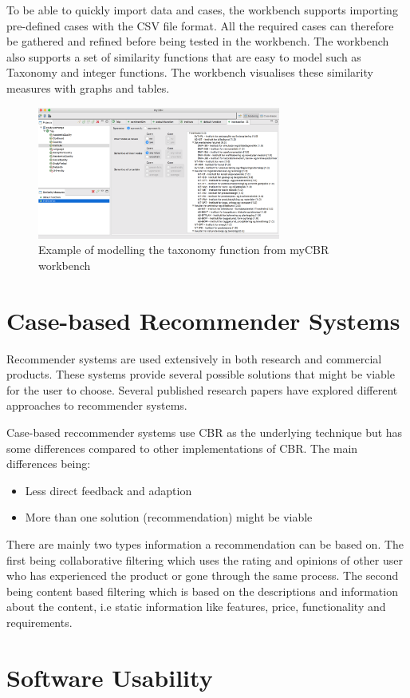To be able to quickly import data and cases, the workbench supports importing pre-defined cases with the CSV file format. All the required cases can therefore be gathered and refined before being tested in the workbench. The workbench also supports a set of similarity functions that are easy to model such as Taxonomy and integer functions. The workbench visualises these similarity measures with graphs and tables.

\begin{figure}[H]
    \centering
    \includegraphics[width=8cm]{fig/myCBRworkbench.png}
    \caption{Example of modelling the taxonomy function from myCBR workbench}
\end{figure}



\section{Case-based Recommender Systems}\label{sec:case_based_recommender_systems}
Recommender systems are used extensively in both research and commercial products. These systems provide several possible solutions that might be viable for the user to choose. Several published research papers have explored different approaches to recommender systems\cite{mulyana2015case}\cite{quijano2011happy}.

Case-based reccommender systems use CBR as the underlying technique but has some differences compared to other implementations of CBR. The main differences being:
 
\begin{itemize}
    \item Less direct feedback and adaption
    \item More than one solution (recommendation) might be viable
\end{itemize}

There are mainly two types information a recommendation can be based on. The first being collaborative filtering which uses the rating and opinions of other user who has experienced the product or gone through the same process. The second being content based filtering which is based on the descriptions and information about the content, i.e static information like features, price, functionality and requirements. 



\section{Software Usability}




\cleardoublepage
